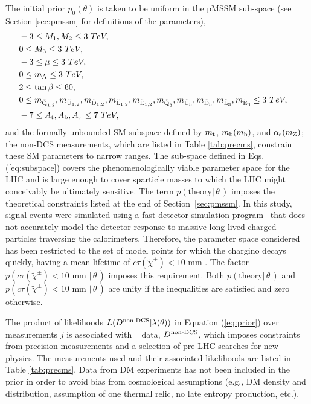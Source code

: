 The initial prior $p_0(\theta)$ is taken to be uniform in the pMSSM sub-space (see Section \ref{sec:pmssm} for definitions of the parameters),
\begin{eqnarray}
	&-3 \le M_1, M_2 \le 3 ~ TeV,& \nonumber\\
	&0 \le M_3 \le 3 ~ TeV,			& \nonumber\\
	&-3 \le \mu \le 3 ~ TeV,		& \nonumber\\
	&0 \le m_{\rm A} \le 3 ~ TeV,			& \nonumber\\
	&2 \le \tan\beta \le 60,		& \nonumber\\
	&0 \le m_{{\tilde{\text{Q}}_{1,2}}}, m_{{\tilde{\text{U}}_{1,2}}}, m_{{\tilde{\text{D}}_{1,2}}}, m_{{\tilde{\text{L}}_{1,2}}}, m_{{\tilde{\text{E}}_{1,2}}}, m_{{\tilde{\text{Q}}_3}}, m_{{\tilde{\text{U}}_3}}, m_{{\tilde{\text{D}}_3}},m_{{\tilde{\text{L}}_3}}, m_{{\tilde{\text{E}}_3}} \le 3 ~ TeV,	& \nonumber\\
	&-7 \le A_{\text{t}}, A_{\text{b}}, A_\tau \le 7 ~ TeV,
\label{eq:subspace}
\end{eqnarray}
and the formally unbounded 
SM subspace defined by $m_{\rm t}$, $m_{\rm b}(m_{\rm
  b})$, and $\alpha_{\rm s}(m_{\rm Z})$; the non-DCS measurements, which are listed in Table \ref{tab:precms}, constrain these SM parameters to narrow ranges.   
The sub-space defined in Eqs. (\ref{eq:subspace}) 
covers the 
phenomenologically viable parameter space for the LHC and 
is large enough to cover sparticle masses to which the LHC might
conceivably be 
ultimately sensitive.  
The term $p(\textrm{theory} |\,\theta\,)$  imposes the theoretical constraints listed at the end of Section~\ref{sec:pmssm}. In this study, signal events were simulated using a fast detector simulation program~\cite{fastsim} that does not accurately model the detector response to massive long-lived charged particles traversing the calorimeters. Therefore, the parameter space considered has been restricted to the set of model points for which the chargino decays quickly, having a mean lifetime of $c\tau(\tilde{\chi}^\pm)<10\text{ mm }$.  The factor $p(c\tau(\tilde{\chi}^\pm)<10\text{ mm } |\, \theta\,)$ imposes this requirement. Both  $p(\textrm{theory} |\, \theta\,)$ 
and $p(c\tau(\tilde{\chi}^\pm)<10\text{ mm } |\,\theta\,)$ are unity if the
inequalities are satisfied and zero otherwise. 


The product of likelihoods $L(D^{\text{non-DCS}}|\lambda(\theta))$ in
Equation (\ref{eq:prior}) over measurements $j$ is associated with \preCMS~ data, $D^{\text{non-DCS}}$,
which imposes constraints from precision measurements and a selection
of pre-LHC searches for new physics. The measurements used and their associated likelihoods are listed in Table \ref{tab:precms}.
Data from DM experiments has not been included in the prior in order to avoid bias from cosmological assumptions (e.g., DM density and distribution, assumption of one thermal relic, no late entropy production, etc.).

